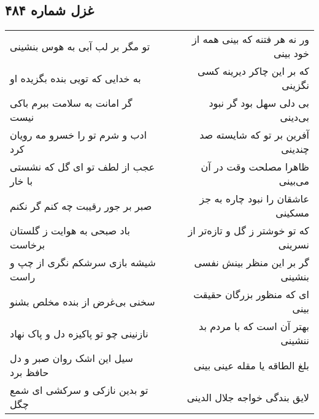 \begin{center}
\section*{غزل شماره ۴۸۴}
\label{sec:sh484}
\begin{longtable}{l p{0.5cm} r}
تو مگر بر لب آبی به هوس بنشینی
&&
ور نه هر فتنه که بینی همه از خود بینی
\\
به خدایی که تویی بنده بگزیده او
&&
که بر این چاکر دیرینه کسی نگزینی
\\
گر امانت به سلامت ببرم باکی نیست
&&
بی دلی سهل بود گر نبود بی‌دینی
\\
ادب و شرم تو را خسرو مه رویان کرد
&&
آفرین بر تو که شایسته صد چندینی
\\
عجب از لطف تو ای گل که نشستی با خار
&&
ظاهرا مصلحت وقت در آن می‌بینی
\\
صبر بر جور رقیبت چه کنم گر نکنم
&&
عاشقان را نبود چاره به جز مسکینی
\\
باد صبحی به هوایت ز گلستان برخاست
&&
که تو خوشتر ز گل و تازه‌تر از نسرینی
\\
شیشه بازی سرشکم نگری از چپ و راست
&&
گر بر این منظر بینش نفسی بنشینی
\\
سخنی بی‌غرض از بنده مخلص بشنو
&&
ای که منظور بزرگان حقیقت بینی
\\
نازنینی چو تو پاکیزه دل و پاک نهاد
&&
بهتر آن است که با مردم بد ننشینی
\\
سیل این اشک روان صبر و دل حافظ برد
&&
بلغ الطاقه یا مقله عینی بینی
\\
تو بدین نازکی و سرکشی ای شمع چگل
&&
لایق بندگی خواجه جلال الدینی
\\
\end{longtable}
\end{center}
